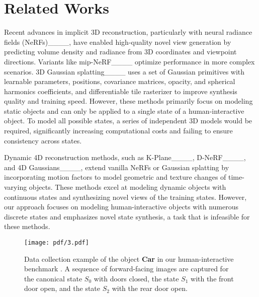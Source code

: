 \section{Related Works}
\label{sec:Related Work}
Recent advances in implicit 3D reconstruction, particularly with neural radiance fields (NeRFs)____, have enabled high-quality novel view generation by predicting volume density and radiance from 3D coordinates and viewpoint directions. Variants like mip-NeRF____ optimize performance in more complex scenarios. 3D Gaussian splatting____ uses a set of Gaussian primitives with learnable parameters, \ie positions, covariance matrices, opacity, and spherical harmonics coefficients, and differentiable tile rasterizer to improve synthesis quality and training speed. However, these methods primarily focus on modeling static objects and can only be applied to a single state of a human-interactive object. To model all possible states, a series of independent 3D models would be required, significantly increasing computational costs and failing to ensure consistency across states.



Dynamic 4D reconstruction methods, such as K-Plane____, D-NeRF____, and 4D Gaussians____, extend vanilla NeRFs or Gaussian splatting by incorporating motion factors to model geometric and texture changes of time-varying objects. 
These methods excel at modeling dynamic objects with continuous states and synthesizing novel views of the training states. However, our approach focuses on modeling human-interactive objects with numerous discrete states and emphasizes novel state synthesis, a task that is infeasible for these methods.




\begin{figure}[!t]
 \centering
  \texttt{[image: pdf/3.pdf]}
   \vspace{-4mm}
    \caption{Data collection example of the object \textbf{Car} in our human-interactive benchmark \textit{\name{}}. A sequence of forward-facing images are captured for the canonical state $S_0$ with doors closed, the state $S_1$ with the front door open, and the state $S_2$ with the rear door open.}
  \label{fig:3}
  \vspace{-4mm}
\end{figure}